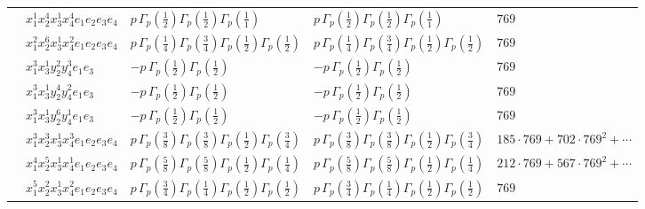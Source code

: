 \documentclass[11pt]{article}
\begin{document}
\begin{table}[ht]
{\begin{tabular}{@{}lllll@{}}
 & $x_{1}^{1} x_{2}^{4} x_{3}^{1} x_{4}^{4}  e_{1} e_{2} e_{3} e_{4}$ & $p \, \Gamma_p \left( \frac{1}{2} \right) \Gamma_p \left( \frac{1}{2} \right) \Gamma_p \left( \frac{1}{1} \right)$ & $p \, \Gamma_p \left( \frac{1}{2} \right) \Gamma_p \left( \frac{1}{2} \right) \Gamma_p \left( \frac{1}{1} \right)$ & $769$ \\
 & $x_{1}^{2} x_{2}^{6} x_{3}^{1} x_{4}^{2}  e_{1} e_{2} e_{3} e_{4}$ & $p \, \Gamma_p \left( \frac{1}{4} \right) \Gamma_p \left( \frac{3}{4} \right) \Gamma_p \left( \frac{1}{2} \right) \Gamma_p \left( \frac{1}{2} \right)$ & $p \, \Gamma_p \left( \frac{1}{4} \right) \Gamma_p \left( \frac{3}{4} \right) \Gamma_p \left( \frac{1}{2} \right) \Gamma_p \left( \frac{1}{2} \right)$ & $769$ \\
 & $x_{1}^{3} x_{3}^{1} y_{2}^{2} y_{4}^{3} e_{1} e_{3}$ & $- p \, \Gamma_p \left( \frac{1}{2} \right) \Gamma_p \left( \frac{1}{2} \right)$ & $- p \, \Gamma_p \left( \frac{1}{2} \right) \Gamma_p \left( \frac{1}{2} \right)$ & $769$ \\
 & $x_{1}^{3} x_{3}^{1} y_{2}^{4} y_{4}^{2} e_{1} e_{3}$ & $- p \, \Gamma_p \left( \frac{1}{2} \right) \Gamma_p \left( \frac{1}{2} \right)$ & $- p \, \Gamma_p \left( \frac{1}{2} \right) \Gamma_p \left( \frac{1}{2} \right)$ & $769$ \\
 & $x_{1}^{3} x_{3}^{1} y_{2}^{6} y_{4}^{1} e_{1} e_{3}$ & $- p \, \Gamma_p \left( \frac{1}{2} \right) \Gamma_p \left( \frac{1}{2} \right)$ & $- p \, \Gamma_p \left( \frac{1}{2} \right) \Gamma_p \left( \frac{1}{2} \right)$ & $769$ \\
 & $x_{1}^{3} x_{2}^{3} x_{3}^{1} x_{4}^{3}  e_{1} e_{2} e_{3} e_{4}$ & $p \, \Gamma_p \left( \frac{3}{8} \right) \Gamma_p \left( \frac{3}{8} \right) \Gamma_p \left( \frac{1}{2} \right) \Gamma_p \left( \frac{3}{4} \right)$ & $p \, \Gamma_p \left( \frac{3}{8} \right) \Gamma_p \left( \frac{3}{8} \right) \Gamma_p \left( \frac{1}{2} \right) \Gamma_p \left( \frac{3}{4} \right)$ & $185{\cdot}769{+}702{\cdot}769^{2}{+}\cdots$ \\
 & $x_{1}^{4} x_{2}^{5} x_{3}^{1} x_{4}^{1}  e_{1} e_{2} e_{3} e_{4}$ & $p \, \Gamma_p \left( \frac{5}{8} \right) \Gamma_p \left( \frac{5}{8} \right) \Gamma_p \left( \frac{1}{2} \right) \Gamma_p \left( \frac{1}{4} \right)$ & $p \, \Gamma_p \left( \frac{5}{8} \right) \Gamma_p \left( \frac{5}{8} \right) \Gamma_p \left( \frac{1}{2} \right) \Gamma_p \left( \frac{1}{4} \right)$ & $212{\cdot}769{+}567{\cdot}769^{2}{+}\cdots$ \\
 & $x_{1}^{5} x_{2}^{2} x_{3}^{1} x_{4}^{2}  e_{1} e_{2} e_{3} e_{4}$ & $p \, \Gamma_p \left( \frac{3}{4} \right) \Gamma_p \left( \frac{1}{4} \right) \Gamma_p \left( \frac{1}{2} \right) \Gamma_p \left( \frac{1}{2} \right)$ & $p \, \Gamma_p \left( \frac{3}{4} \right) \Gamma_p \left( \frac{1}{4} \right) \Gamma_p \left( \frac{1}{2} \right) \Gamma_p \left( \frac{1}{2} \right)$ & $769$ \\

\end{tabular}}
\end{table}
\end{document}
